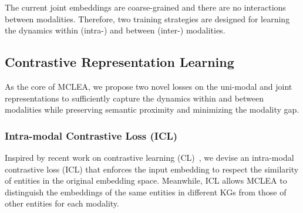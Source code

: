 \documentclass[11pt]{article}
\begin{document}
The current joint embeddings are coarse-grained and there are no interactions between modalities. 
Therefore, two training strategies are designed for learning the dynamics within (intra-) and between (inter-) modalities.

\subsection{Contrastive Representation Learning}
\label{sec:cl}

As the core of MCLEA, we propose two novel losses on the uni-modal and joint representations to sufficiently capture the dynamics within and between modalities while preserving semantic proximity and minimizing the modality gap.

\subsubsection{Intra-modal Contrastive Loss (ICL)} 

Inspired by recent work on contrastive learning (CL)~\cite{chen2020simple,khosla2020supervised}, we devise an intra-modal contrastive loss (ICL) that enforces the input embedding to respect the similarity of entities in the original embedding space.
Meanwhile, ICL allows MCLEA to distinguish the embeddings of the same entities in different KGs from those of other entities for each modality.
\end{document}
